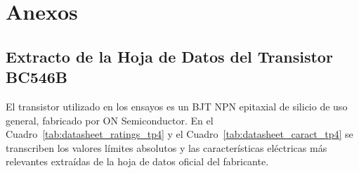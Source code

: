\chapter{Anexos}
\label{chap:anexos}

\section{Extracto de la Hoja de Datos del Transistor BC546B}

El transistor utilizado en los ensayos es un BJT NPN epitaxial de silicio de uso general, fabricado por ON Semiconductor.
En el Cuadro~\ref{tab:datasheet_ratings_tp4} y el Cuadro~\ref{tab:datasheet_caract_tp4} se transcriben los valores
límites absolutos y las características eléctricas más relevantes extraídas de la hoja de datos oficial del fabricante.

\begin{table}[!ht]
  \centering
  \caption{Límites máximos absolutos de operación del transistor BC546B (ON Semiconductor).}
  \label{tab:datasheet_ratings_tp4}
\end{table}

